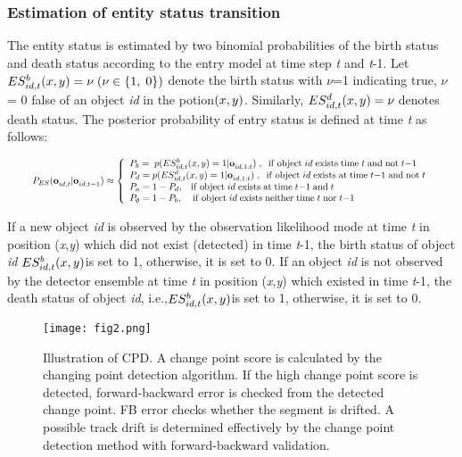 \documentclass[runningheads]{llncs}
\begin{document}
\subsubsection{Estimation of entity status transition}

The entity status is estimated by two binomial probabilities of the birth status and death status according to the entry model at time step \textit{t} and \textit{t}-1. Let $ES_{id,t}^{b} {\rm (}x,y{\rm )}=\nu \; {\rm (}\nu \in {\rm \{ 1,\; 0\} )}$ denote the birth status with $\nu $=1 indicating true, $\nu $= 0 false of an object \textit{id} in the potion${\rm (}x,y{\rm )}$. Similarly, $ES_{id,t}^{d} {\rm (}x,y{\rm )}=\nu \; $denotes death status. The posterior probability of entry status is defined at time \textit{t} as follows:

\begin{equation} \label{GrindEQ__3_} 
\resizebox{.93\hsize}{!}{$
P_{ES} {\rm (}{\bf o}_{id,t}^{} |{\bf o}_{id,t-1}^{} {\rm )}\approx \left\{\begin{array}{l} {P_{b} ={\rm \; }p{\rm (}ES_{id,t}^{b} {\rm (}x,y{\rm )}=1|{\bf o}_{id,1:t}^{} {\rm )\; ,\; \; if\; object\; }id{\rm \; exists\; time\; }t{\rm \; and\; not\; }t{\rm -1}} \\ {P_{d} =p{\rm (}ES_{id,t}^{d} {\rm (}x,y{\rm )}=1|{\bf o}_{id,1:t}^{} {\rm )\; ,\; \; if\; object\; }id{\rm \; exists\; at\; time\; }t{\rm -1\; and\; not\; }t} \\ {P_{a} =1-P_{d} ,{\rm \; \; \; if\; object\; }id{\rm \; exists\; at\; time\; }t{\rm -1\; and\; }t} \\ {P_{\emptyset } =1-P_{b} ,{\rm \; \; \; \; if\; object\; }id{\rm \; exists\; neither\; time\; }t{\rm \; nor\; }t{\rm -1}} \end{array}\right.  
$}
\end{equation} 

If a new object \textit{id} is observed by the observation likelihood mode at time \textit{t} in position (\textit{x},\textit{y}) which\textit{ }did not exist (detected) in time \textit{t}-1, the birth status of object \textit{id} $ES_{id,t}^{b} {\rm (}x,y{\rm )}$is set to 1, otherwise, it is set to 0. If an object \textit{id} is not observed by the detector ensemble at time \textit{t} in position (\textit{x},\textit{y}) which\textit{ }existed in time \textit{t}-1, the death status of object \textit{id}, i.e.,$ES_{id,t}^{b} {\rm (}x,y{\rm )}$is set to 1, otherwise, it is set to 0. 

\begin{figure}[t!]
\centering
\texttt{[image: fig2.png]}
\caption{Illustration of CPD. A change point score is calculated by the changing point detection algorithm. If the high change point score is detected, forward-backward error is checked from the detected change point. FB error checks whether the segment is drifted. A possible track drift is determined effectively by the change point detection method with forward-backward validation.}
\label{fig:2}
\end{figure}
\end{document}
